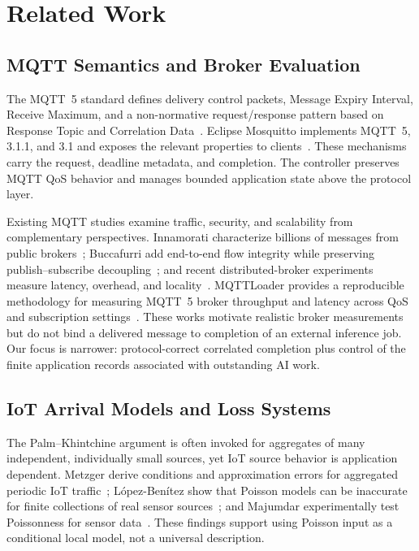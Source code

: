\section{Related Work}
\label{sec:related}

\subsection{MQTT Semantics and Broker Evaluation}

The MQTT~5 standard defines delivery control packets, Message Expiry Interval, Receive Maximum, and a non-normative request/response pattern based on Response Topic and Correlation Data~\cite{oasis2019mqtt}. Eclipse Mosquitto implements MQTT~5, 3.1.1, and 3.1 and exposes the relevant properties to clients~\cite{mosquitto2026manual}. These mechanisms carry the request, deadline metadata, and completion. The controller preserves MQTT QoS behavior and manages bounded application state above the protocol layer.

Existing MQTT studies examine traffic, security, and scalability from complementary perspectives. Innamorati \etal{} characterize billions of messages from public brokers~\cite{innamorati2026pulse}; Buccafurri \etal{} add end-to-end flow integrity while preserving publish--subscribe decoupling~\cite{buccafurri2024mqtt}; and recent distributed-broker experiments measure latency, overhead, and locality~\cite{rostamivand2025distributed}. MQTTLoader provides a reproducible methodology for measuring MQTT~5 broker throughput and latency across QoS and subscription settings~\cite{banno2021mqttloader}. These works motivate realistic broker measurements but do not bind a delivered message to completion of an external inference job. Our focus is narrower: protocol-correct correlated completion plus control of the finite application records associated with outstanding AI work.

\subsection{IoT Arrival Models and Loss Systems}

The Palm--Khintchine argument is often invoked for aggregates of many independent, individually small sources, yet IoT source behavior is application dependent. Metzger \etal{} derive conditions and approximation errors for aggregated periodic IoT traffic~\cite{metzger2019modeling}; L\'opez-Ben\'itez \etal{} show that Poisson models can be inaccurate for finite collections of real sensor sources~\cite{lopez2020aggregated}; and Majumdar \etal{} experimentally test Poissonness for sensor data~\cite{majumdar2019poissonness}. These findings support using Poisson input as a conditional local model, not a universal description.

